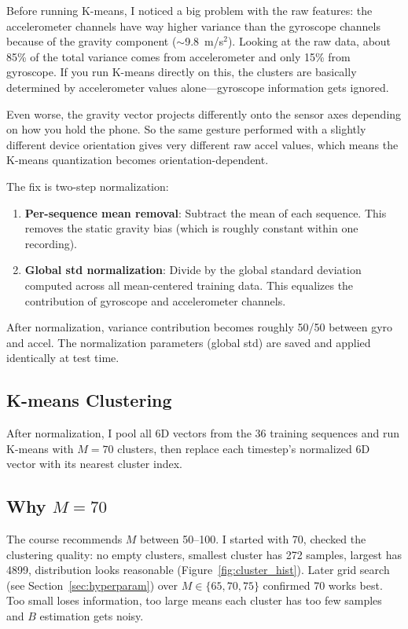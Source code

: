 \documentclass[11pt]{article}
\begin{document}
Before running K-means, I noticed a big problem with the raw features: the accelerometer channels have way higher variance than the gyroscope channels because of the gravity component ($\sim$9.8~m/s$^2$). Looking at the raw data, about 85\% of the total variance comes from accelerometer and only 15\% from gyroscope. If you run K-means directly on this, the clusters are basically determined by accelerometer values alone---gyroscope information gets ignored.

Even worse, the gravity vector projects differently onto the sensor axes depending on how you hold the phone. So the same gesture performed with a slightly different device orientation gives very different raw accel values, which means the K-means quantization becomes orientation-dependent.

The fix is two-step normalization:
\begin{enumerate}[nosep]
    \item \textbf{Per-sequence mean removal}: Subtract the mean of each sequence. This removes the static gravity bias (which is roughly constant within one recording).
    \item \textbf{Global std normalization}: Divide by the global standard deviation computed across all mean-centered training data. This equalizes the contribution of gyroscope and accelerometer channels.
\end{enumerate}

After normalization, variance contribution becomes roughly 50/50 between gyro and accel. The normalization parameters (global std) are saved and applied identically at test time.

\subsection{K-means Clustering}

After normalization, I pool all 6D vectors from the 36 training sequences and run K-means with $M=70$ clusters, then replace each timestep's normalized 6D vector with its nearest cluster index.

\subsection{Why $M=70$}

The course recommends $M$ between 50--100. I started with 70, checked the clustering quality: no empty clusters, smallest cluster has 272 samples, largest has 4899, distribution looks reasonable (Figure~\ref{fig:cluster_hist}). Later grid search (see Section~\ref{sec:hyperparam}) over $M \in \{65, 70, 75\}$ confirmed 70 works best. Too small loses information, too large means each cluster has too few samples and $B$ estimation gets noisy.
\end{document}
